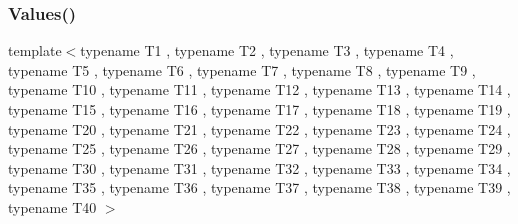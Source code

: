 \mbox{\label{namespacetesting_adaa8b96d44c103a70e5c4a4b3430ef4d}} 
\subsubsection{\texorpdfstring{Values()}{Values()}\hspace{0.1cm}{\footnotesize\ttfamily [40/50]}}
{\footnotesize\ttfamily template$<$typename T1 , typename T2 , typename T3 , typename T4 , typename T5 , typename T6 , typename T7 , typename T8 , typename T9 , typename T10 , typename T11 , typename T12 , typename T13 , typename T14 , typename T15 , typename T16 , typename T17 , typename T18 , typename T19 , typename T20 , typename T21 , typename T22 , typename T23 , typename T24 , typename T25 , typename T26 , typename T27 , typename T28 , typename T29 , typename T30 , typename T31 , typename T32 , typename T33 , typename T34 , typename T35 , typename T36 , typename T37 , typename T38 , typename T39 , typename T40 $>$ \\
}
